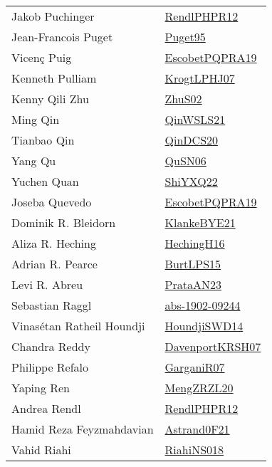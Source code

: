 {\begin{longtable}{p{4cm}p{20cm}}
Jakob Puchinger & \href{papers/RendlPHPR12.pdf}{RendlPHPR12}\cite{RendlPHPR12} \\
Jean{-}Francois Puget & \href{papers/Puget95.pdf}{Puget95}\cite{Puget95} \\
Vicen{\c{c}} Puig & \href{articles/EscobetPQPRA19.pdf}{EscobetPQPRA19}\cite{EscobetPQPRA19} \\
Kenneth Pulliam & \href{papers/KrogtLPHJ07.pdf}{KrogtLPHJ07}\cite{KrogtLPHJ07} \\
Kenny Qili Zhu & \href{papers/ZhuS02.pdf}{ZhuS02}\cite{ZhuS02} \\
Ming Qin & \href{articles/QinWSLS21.pdf}{QinWSLS21}\cite{QinWSLS21} \\
Tianbao Qin & \href{articles/QinDCS20.pdf}{QinDCS20}\cite{QinDCS20} \\
Yang Qu & \href{papers/QuSN06.pdf}{QuSN06}\cite{QuSN06} \\
Yuchen Quan & \href{}{ShiYXQ22}\cite{ShiYXQ22} \\
Joseba Quevedo & \href{articles/EscobetPQPRA19.pdf}{EscobetPQPRA19}\cite{EscobetPQPRA19} \\
Dominik R. Bleidorn & \href{papers/KlankeBYE21.pdf}{KlankeBYE21}\cite{KlankeBYE21} \\
Aliza R. Heching & \href{papers/HechingH16.pdf}{HechingH16}\cite{HechingH16} \\
Adrian R. Pearce & \href{papers/BurtLPS15.pdf}{BurtLPS15}\cite{BurtLPS15} \\
Levi R. Abreu & \href{articles/PrataAN23.pdf}{PrataAN23}\cite{PrataAN23} \\
Sebastian Raggl & \href{articles/abs-1902-09244.pdf}{abs-1902-09244}\cite{abs-1902-09244} \\
Vinas{\'{e}}tan Ratheil Houndji & \href{papers/HoundjiSWD14.pdf}{HoundjiSWD14}\cite{HoundjiSWD14} \\
Chandra Reddy & \href{papers/DavenportKRSH07.pdf}{DavenportKRSH07}\cite{DavenportKRSH07} \\
Philippe Refalo & \href{papers/GarganiR07.pdf}{GarganiR07}\cite{GarganiR07} \\
Yaping Ren & \href{articles/MengZRZL20.pdf}{MengZRZL20}\cite{MengZRZL20} \\
Andrea Rendl & \href{papers/RendlPHPR12.pdf}{RendlPHPR12}\cite{RendlPHPR12} \\
Hamid Reza Feyzmahdavian & \href{papers/Astrand0F21.pdf}{Astrand0F21}\cite{Astrand0F21} \\
Vahid Riahi & \href{}{RiahiNS018}\cite{RiahiNS018} \\

\end{longtable}}
